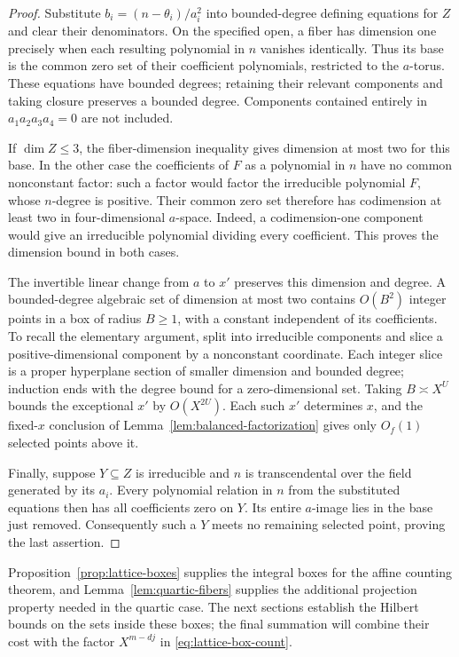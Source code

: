 \begin{proof}
Substitute $b_i=(n-\theta_i)/a_i^2$ into bounded-degree defining
equations for $Z$ and clear their denominators. On the specified
open, a fiber has dimension one precisely when each resulting
polynomial in $n$ vanishes identically. Thus its base is the common
zero set of their coefficient polynomials, restricted to the
$a$-torus. These equations have bounded degrees; retaining their
relevant components and taking closure preserves a bounded degree.
Components contained entirely in $a_1a_2a_3a_4=0$ are not included.

If $\dim Z\le3$, the fiber-dimension inequality gives dimension
at most two for this base. In the other case the coefficients of
$F$ as a polynomial in $n$ have no common nonconstant factor:
such a factor would factor the irreducible polynomial $F$, whose
$n$-degree is positive. Their common zero set therefore has
codimension at least two in four-dimensional $a$-space. Indeed,
a codimension-one component would give an irreducible polynomial
dividing every coefficient. This proves the dimension bound in
both cases.

The invertible linear change from $a$ to $x'$ preserves this
dimension and degree. A bounded-degree algebraic set of dimension
at most two contains $O(B^2)$ integer points in a box of radius
$B\ge1$, with a constant independent of its coefficients.
To recall the elementary argument, split into irreducible
components and slice a positive-dimensional component by a
nonconstant coordinate. Each integer slice is a proper
hyperplane section of smaller dimension and bounded degree;
induction ends with the degree bound for a zero-dimensional set.
Taking $B\asymp X^U$ bounds the exceptional $x'$ by $O(X^{2U})$.
Each such $x'$ determines $x$, and the fixed-$x$ conclusion of
Lemma~\ref{lem:balanced-factorization} gives only $O_f(1)$ selected
points above it.

Finally, suppose $Y\subseteq Z$ is irreducible and $n$ is
transcendental over the field generated by its $a_i$. Every
polynomial relation in $n$ from the substituted equations then
has all coefficients zero on $Y$. Its entire $a$-image lies in
the base just removed. Consequently such a $Y$ meets no remaining
selected point, proving the last assertion.
\end{proof}

Proposition~\ref{prop:lattice-boxes} supplies the integral boxes
for the affine counting theorem, and Lemma~\ref{lem:quartic-fibers}
supplies the additional projection property needed in the quartic
case. The next sections establish the Hilbert bounds on the sets
inside these boxes; the final summation will combine their cost
with the factor $X^{m-dj}$ in \eqref{eq:lattice-box-count}.
